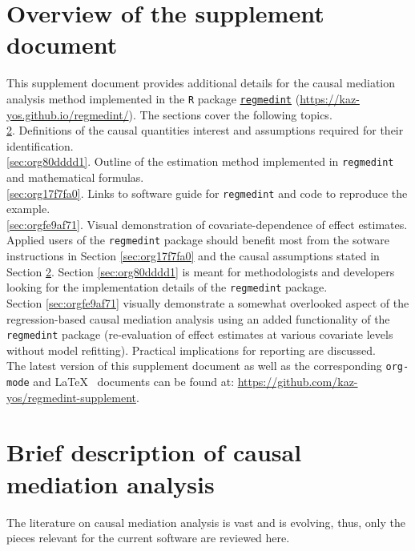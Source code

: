 \documentclass[10pt]{article}
\date{\today}
\title{}
\begin{document}
\tableofcontents

\sloppy
\setcounter{page}{0}
\newpage
\setcounter{section}{-1}
\section{Overview of the supplement document}
\label{sec:org28b65c8}

This supplement document provides additional details for the causal mediation analysis method implemented in the \texttt{R} package \href{https://kaz-yos.github.io/regmedint/}{\texttt{regmedint}} (\url{https://kaz-yos.github.io/regmedint/}). The sections cover the following topics.\\

\ref{sec:orgfed4357}. Definitions of the causal quantities interest and assumptions required for their identification.\\
\ref{sec:org80dddd1}. Outline of the estimation method implemented in \texttt{regmedint} and mathematical formulas.\\
\ref{sec:org17f7fa0}. Links to software guide for \texttt{regmedint} and code to reproduce the example.\\
\ref{sec:orgfe9af71}. Visual demonstration of covariate-dependence of effect estimates.\\

Applied users of the \texttt{regmedint} package should benefit most from the sotware instructions in Section \ref{sec:org17f7fa0} and the causal assumptions stated in Section \ref{sec:orgfed4357}. Section \ref{sec:org80dddd1} is meant for methodologists and developers looking for the implementation details of the \texttt{regmedint} package.\\

Section \ref{sec:orgfe9af71} visually demonstrate a somewhat overlooked aspect of the regression-based causal mediation analysis using an added functionality of the \texttt{regmedint} package (re-evaluation of effect estimates at various covariate levels without model refitting). Practical implications for reporting are discussed.\\

The latest version of this supplement document as well as the corresponding \texttt{org-mode} and \LaTeX ~ documents can be found at: \url{https://github.com/kaz-yos/regmedint-supplement}.


\section{Brief description of causal mediation analysis}
\label{sec:orgfed4357}
The literature on causal mediation analysis is vast \cite{vanderweeleExplanationCausalInference2015} and is evolving, thus, only the pieces relevant for the current software are reviewed here.
\end{document}
